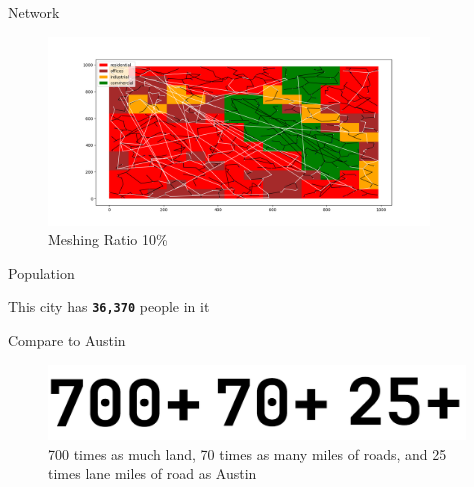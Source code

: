 \documentclass[10pt, aspectratio=169]{beamer}
\begin{document}
\begin{frame}{Network}
    \begin{center}
        \begin{figure}
            \centering
            \includegraphics[height=5cm, keepaspectratio]{images/build_city/links.png}
            \caption{Meshing Ratio 10\%}
        \end{figure}
    \end{center}
\end{frame}

\begin{frame}{Population}
    \begin{center}
        \Huge This city has \texttt{\textbf{36,370}} people in it
    \end{center}
\end{frame}

\begin{frame}{Compare to Austin}
    \begin{center}
        \begin{figure}
            \centering
            \includegraphics[height=2cm, keepaspectratio]{images/build_city/stats.png}
            \caption{700 times as much land, 70 times as many miles of roads, and 25 times lane miles of road as Austin}
        \end{figure}
    \end{center}
\end{frame}
\end{document}
